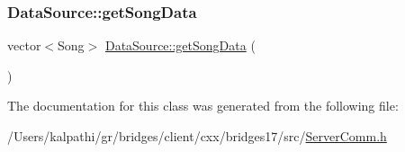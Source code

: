 \subsubsection{\texorpdfstring{Data\+Source\+::get\+Song\+Data}{DataSource::getSongData}}
{\footnotesize\ttfamily vector$<$Song$>$ \mbox{\hyperlink{namespacebridges_1_1_data_source_a325b6f25041e833bc2fd561bd2c2ee6e}{Data\+Source\+::get\+Song\+Data}} (\begin{DoxyParamCaption}{ }\end{DoxyParamCaption})\hspace{0.3cm}{\ttfamily [friend]}}



The documentation for this class was generated from the following file\+:\begin{DoxyCompactItemize}
\item 
/\+Users/kalpathi/gr/bridges/client/cxx/bridges17/src/\mbox{\hyperlink{_server_comm_8h}{Server\+Comm.\+h}}\end{DoxyCompactItemize}
